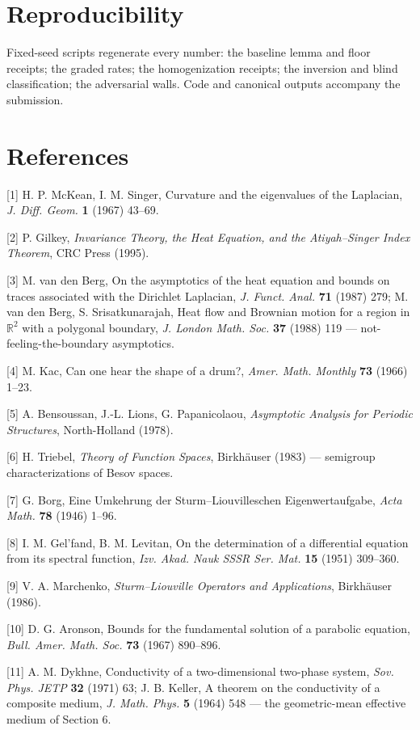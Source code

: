 \documentclass[11pt]{article}
\begin{document}
\section*{Reproducibility}
Fixed-seed scripts regenerate every number: the baseline lemma and floor receipts; the graded rates; the homogenization receipts; the inversion and blind classification; the adversarial walls.  Code and canonical outputs accompany the submission.

\section*{References}
[1] H. P. McKean, I. M. Singer, Curvature and the eigenvalues of the Laplacian, \emph{J. Diff. Geom.} \textbf{1} (1967) 43–69.

[2] P. Gilkey, \emph{Invariance Theory, the Heat Equation, and the Atiyah–Singer Index Theorem}, CRC Press (1995).

[3] M. van den Berg, On the asymptotics of the heat equation and bounds on traces associated with the Dirichlet Laplacian, \emph{J. Funct. Anal.} \textbf{71} (1987) 279; M. van den Berg, S. Srisatkunarajah, Heat flow and Brownian motion for a region in $\mathbb R^2$ with a polygonal boundary, \emph{J. London Math. Soc.} \textbf{37} (1988) 119 — not-feeling-the-boundary asymptotics.

[4] M. Kac, Can one hear the shape of a drum?, \emph{Amer. Math. Monthly} \textbf{73} (1966) 1–23.

[5] A. Bensoussan, J.-L. Lions, G. Papanicolaou, \emph{Asymptotic Analysis for Periodic Structures}, North-Holland (1978).

[6] H. Triebel, \emph{Theory of Function Spaces}, Birkhäuser (1983) — semigroup characterizations of Besov spaces.

[7] G. Borg, Eine Umkehrung der Sturm–Liouvilleschen Eigenwertaufgabe, \emph{Acta Math.} \textbf{78} (1946) 1–96.

[8] I. M. Gel'fand, B. M. Levitan, On the determination of a differential equation from its spectral function, \emph{Izv. Akad. Nauk SSSR Ser. Mat.} \textbf{15} (1951) 309–360.

[9] V. A. Marchenko, \emph{Sturm–Liouville Operators and Applications}, Birkhäuser (1986).

[10] D. G. Aronson, Bounds for the fundamental solution of a parabolic equation, \emph{Bull. Amer. Math. Soc.} \textbf{73} (1967) 890–896.

[11] A. M. Dykhne, Conductivity of a two-dimensional two-phase system, \emph{Sov. Phys. JETP} \textbf{32} (1971) 63; J. B. Keller, A theorem on the conductivity of a composite medium, \emph{J. Math. Phys.} \textbf{5} (1964) 548 — the geometric-mean effective medium of Section 6.
\end{document}

